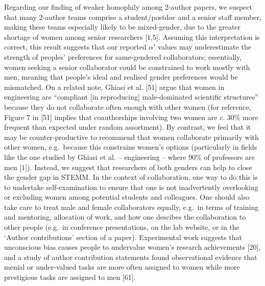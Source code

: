 \documentclass[12pt,]{article}
\begin{document}
Regarding our finding of weaker homophily among 2-author papers, we
suspect that many 2-author teams comprise a student/postdoc and a senior
staff member, making these teams especially likely to be mixed-gender,
due to the greater shortage of women among senior researchers {[}1,5{]}.
Assuming this interpretation is correct, this result suggests that our
reported \(\alpha'\) values may underestimate the strength of peoples'
preferences for same-gendered collaborators; essentially, women seeking
a senior collaborator could be constrained to work mostly with men,
meaning that people's ideal and realised gender preferences would be
mismatched. On a related note, Ghiasi et al. {[}51{]} argue that women
in engineering are ``compliant {[}in reproducing{]} male-dominated
scientific structures'' because they do not collaborate often enough
with other women (for reference, Figure 7 in {[}51{]} implies that
coauthorships involving two women are \(c\). 30\% more frequent than
expected under random assortment). By contrast, we feel that it may be
counter-productive to recommend that women collaborate primarily with
other women, e.g.~because this constrains women's options (particularly
in fields like the one studied by Ghiasi et al. -- engineering -- where
90\% of professors are men {[}1{]}). Instead, we suggest that
researchers of both genders can help to close the gender gap in STEMM.
In the context of collaboration, one way to do this is to undertake
self-examination to ensure that one is not inadvertently overlooking or
excluding women among potential students and colleagues. One should also
take care to treat male and female collaborators equally, e.g.~in terms
of training and mentoring, allocation of work, and how one descibes the
collaboration to other people (e.g.~in conference presentations, on the
lab website, or in the `Author contributions' section of a paper).
Experimental work suggests that unconscious bias causes people to
undervalue women's research achievements {[}20{]}, and a study of author
contribution statements found observational evidence that menial or
under-valued tasks are more often assigned to women while more
prestigious tasks are assigned to men {[}61{]}.
\end{document}

